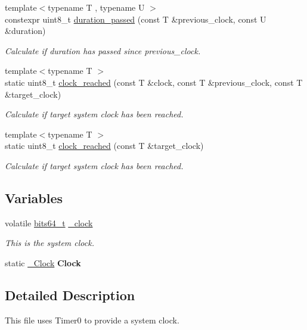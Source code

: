 \begin{DoxyCompactItemize}
{\footnotesize template$<$typename T , typename U $>$ }\\constexpr uint8\+\_\+t \hyperlink{namespaceclock_a4db26a90b5c001f2bb46af7a2069d63d}{duration\+\_\+passed} (const T \&previous\+\_\+clock, const U \&duration)
\begin{DoxyCompactList}\small\item\em Calculate if duration has passed since previous\+\_\+clock. \end{DoxyCompactList}\item 
{\footnotesize template$<$typename T $>$ }\\static uint8\+\_\+t \hyperlink{namespaceclock_a107ad02a77763be28bf63d43c566cf75}{clock\+\_\+reached} (const T \&clock, const T \&previous\+\_\+clock, const T \&target\+\_\+clock)
\begin{DoxyCompactList}\small\item\em Calculate if target system clock has been reached. \end{DoxyCompactList}\item 
{\footnotesize template$<$typename T $>$ }\\static uint8\+\_\+t \hyperlink{namespaceclock_a240d81de9119f92701aa5f26555972c4}{clock\+\_\+reached} (const T \&target\+\_\+clock)
\begin{DoxyCompactList}\small\item\em Calculate if target system clock has been reached. \end{DoxyCompactList}\end{DoxyCompactItemize}
\subsection*{Variables}
\begin{DoxyCompactItemize}
\item 
volatile \hyperlink{unionbits64__s}{bits64\+\_\+t} \hyperlink{namespaceclock_a0cfce972d3684eddb3dd61bb0baaf225}{\+\_\+clock}
\begin{DoxyCompactList}\small\item\em This is the system clock. \end{DoxyCompactList}\item 
\hypertarget{namespaceclock_a8414359d2fd2b9f75143850c0e3bb4b5}{}\label{namespaceclock_a8414359d2fd2b9f75143850c0e3bb4b5} 
static \hyperlink{classclock_1_1__Clock}{\+\_\+\+Clock} {\bfseries Clock}
\end{DoxyCompactItemize}


\subsection{Detailed Description}
This file uses {\ttfamily Timer0} to provide a system clock. 

